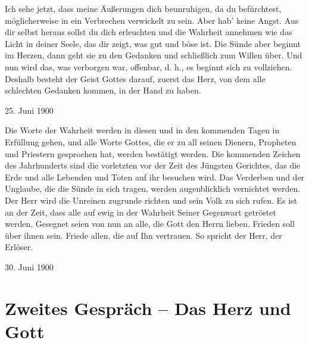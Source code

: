 Ich sehe jetzt, dass meine Äußerungen dich beunruhigen, da du befürchtest, möglicherweise in ein Verbrechen verwickelt zu sein. Aber hab' keine Angst. Aus dir selbst heraus sollst du dich erleuchten und die Wahrheit annehmen wie das Licht in deiner Seele, das dir zeigt, was gut und böse ist. Die Sünde aber beginnt im Herzen, dann geht sie zu den Gedanken und schließlich zum Willen über. Und nun wird das, was verborgen war, offenbar, d. h., es beginnt sich zu vollziehen. Deshalb besteht der Geist Gottes darauf, zuerst das Herz, von dem alle schlechten Gedanken kommen, in der Hand zu haben.

25. Juni 1900


Die Worte der Wahrheit werden in diesen und in den kommenden Tagen in Erfüllung gehen, und alle Worte Gottes, die er zu all seinen Dienern, Propheten und Priestern gesprochen hat, werden bestätigt werden. Die kommenden Zeichen des Jahrhunderts sind die vorletzten vor der Zeit des Jüngsten Gerichtes, das die Erde und alle Lebenden und Toten auf ihr besuchen wird. Das Verderben und der Unglaube, die die Sünde in sich tragen, werden augenblicklich vernichtet werden. Der Herr wird die Unreinen zugrunde richten und sein Volk zu sich rufen. Es ist an der Zeit, dass alle auf ewig in der Wahrheit Seiner Gegenwart getröstet werden. Gesegnet seien von nun an alle, die Gott den Herrn lieben. Frieden soll über ihnen sein. Friede allen, die auf Ihn vertrauen. So spricht der Herr, der Erlöser. 



30. Juni 1900

\section{Zweites Gespräch -- Das Herz und Gott}

